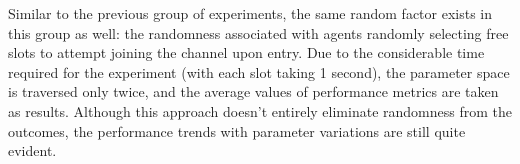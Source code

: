 Similar to the previous group of experiments, the same random factor exists in this group as well: the randomness associated with agents randomly selecting free slots to attempt joining the channel upon entry. 
Due to the considerable time required for the experiment (with each slot taking 1 second), the parameter space is traversed only twice, and the average values of performance metrics are taken as results. 
Although this approach doesn't entirely eliminate randomness from the outcomes, the performance trends with parameter variations are still quite evident.


